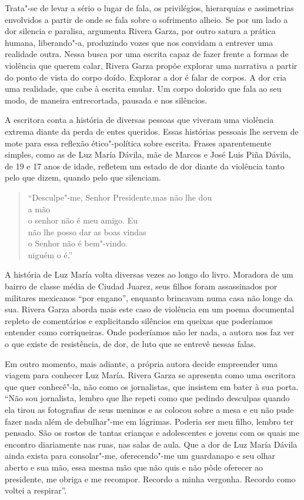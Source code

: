 Trata"-se de levar a sério o lugar de fala, os privilégios, hierarquias e
assimetrias envolvidos a partir de onde se fala sobre o sofrimento
alheio. Se por um lado a dor silencia e paralisa, argumenta Rivera
Garza, por outro satura a prática humana, liberando"-a, produzindo vozes
que nos convidam a entrever uma realidade outra. Nessa busca por uma
escrita capaz de fazer frente a formas de violência que
querem calar, Rivera Garza propõe explorar uma narrativa a partir do
ponto de vista do corpo doído. Explorar a dor é falar de corpos. A dor
cria uma realidade, que cabe à escrita emular. Um corpo dolorido que
fala ao seu modo, de maneira entrecortada, pausada e nos silêncios.

A escritora conta a história de diversas pessoas que viveram uma
violência extrema diante da perda de entes queridos.
Essas histórias pessoais lhe servem de mote para essa reflexão
ético"-política sobre escrita. Frases
aparentemente simples, como as de Luz María Dávila, mãe de Marcos e José
Luis Piña Dávila, de 19 e 17 anos de idade, refletem um estado de dor
diante da violência tanto pelo que dizem, quando pelo que silenciam.

\pagebreak

\begin{verse}
``Desculpe"-me, Senhor Presidente,\qb{}mas não lhe dou\\
a mão\\
o senhor não é meu amigo. Eu\\
não lhe posso dar as boas vindas\\
o Senhor não é bem"-vindo.\\
niguém o é.''
\end{verse}

A história de Luz María volta diversas vezes ao longo do livro. Moradora
de um bairro de classe média de Ciudad Juarez, seus filhos foram
assassinados por militares mexicanos ``por engano'', enquanto brincavam
numa casa não longe da sua. Rivera Garza aborda mais este caso de
violência em um poema documental repleto de comentários e explicitando
silêncios em queixas que poderíamos entender como corriqueiras. Onde
poderíamos não ler nada, a autora nos faz ver o que existe de
resistência, de dor, de luto que se entrevê nessas falas.

Em outro momento, mais adiante, a própria autora decide
empreender uma viagem para conhecer Luz María. Rivera Garza se apresenta
como uma escritora que quer conhecê"-la, não como os jornalistas, que
insistem em bater à sua porta. ``Não sou jornalista, lembro que lhe
repeti como que pedindo desculpas quando ela tirou as fotografias de
seus meninos e as colocou sobre a mesa e eu não pude fazer nada além de
debulhar"-me em lágrimas. Poderia ser meu filho, lembro ter pensado. São
os rostos de tantas crianças e adolescentes e jovens com os quais me
encontro diariamente nas ruas, nas salas de aula. Que a dor de Luz María
Dávila ainda exista para consolar"-me, oferecendo"-me um guardanapo e seu
olhar aberto e sua mão, essa mesma mão que não quis e não pôde oferecer
ao presidente, me obriga e me recompor. Recordo a minha vergonha.
Recordo como voltei a respirar''.

